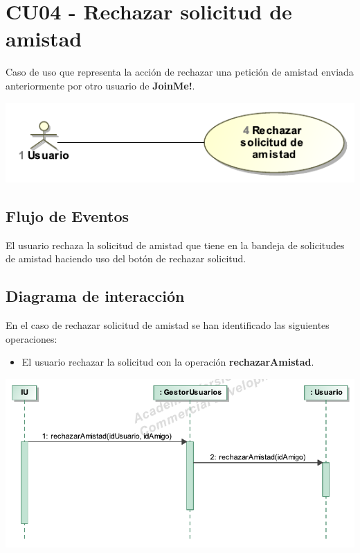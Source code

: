 \documentclass[12pt, a4paper, titlepage]{article}
\begin{document}
\section{CU04 - Rechazar solicitud de amistad}

Caso de uso que representa la acción de rechazar una petición de amistad enviada anteriormente por otro usuario de \textbf{JoinMe!}.

\begin{center}
	\includegraphics{Imagenes/RechazarSolicitudAmistadCU}
\end{center}
\subsection{Flujo de Eventos}

El usuario rechaza la solicitud de amistad que tiene en la bandeja de solicitudes de amistad haciendo uso del botón de rechazar solicitud.

\subsection{Diagrama de interacción}
En el caso de {\sc rechazar solicitud de amistad } se han identificado las siguientes operaciones:

\begin{itemize}
	\item El usuario rechazar la solicitud con la operación \textbf{rechazarAmistad}.
\end{itemize}

\begin{center}
	\includegraphics{Imagenes/OperacionRechazarAmistad}
\end{center}
\end{document}
